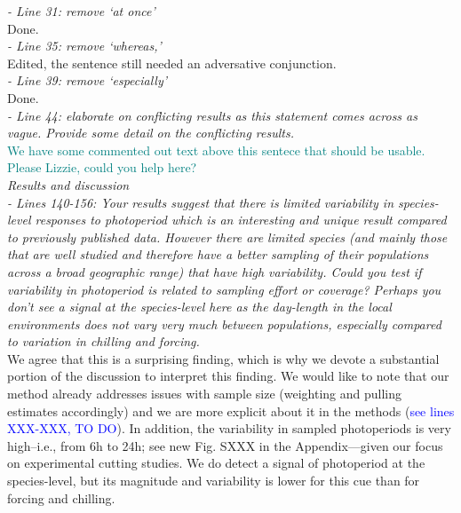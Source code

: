 \documentclass[11pt]{article}
\begin{document}
\emph{- Line 31: remove ‘at once’}\\
Done.\\

\emph{- Line 35: remove ‘whereas,’}\\
Edited, the sentence still needed an adversative conjunction.\\

\emph{- Line 39: remove ‘especially’}\\
Done.\\

\emph{- Line 44: elaborate on conflicting results as this statement comes across as vague. Provide some detail on the conflicting results.}\\
\textcolor{teal}{We have some commented out text above this sentece that should be usable. Please Lizzie, could you help here?}\\

\emph{Results and discussion}\\
\emph{- Lines 140-156: Your results suggest that there is limited variability in species-level responses to photoperiod which is an interesting and unique result compared to previously published data. However there are limited species (and mainly those that are well studied and therefore have a better sampling of their populations across a broad geographic range) that have high variability. Could you test if variability in photoperiod is related to sampling effort or coverage? Perhaps you don’t see a signal at the species-level here as the day-length in the local environments does not vary very much between populations, especially compared to variation in chilling and forcing.}\\

We agree that this is a surprising finding, which is why we devote a substantial portion of the discussion to interpret this finding. We would like to note that our method already addresses issues with sample size (weighting and pulling estimates accordingly) and we are more explicit about it in the methods (\textcolor{blue}{see lines XXX-XXX, TO DO}). In addition, the variability in sampled photoperiods is very high--i.e., from 6h to 24h; see new Fig. SXXX in the Appendix---given our focus on experimental cutting studies. We do detect a signal of photoperiod at the species-level, but its magnitude and variability is lower for this cue than for forcing and chilling.\\

\end{document}
